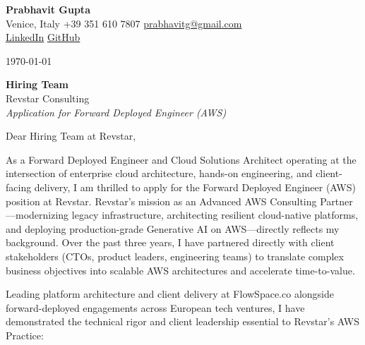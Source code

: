 \documentclass[11pt,a4paper]{article}
\begin{document}
\begin{center}
    {\huge \textbf{Prabhavit Gupta}} \\
    \vspace{3pt}
    Venice, Italy \textbar{} +39 351 610 7807 \textbar{} \href{mailto:prabhavitg@gmail.com}{prabhavitg@gmail.com} \\
    \href{https://www.linkedin.com/in/prabhavit/}{LinkedIn} \textbar{} \href{https://github.com/prab-gupta}{GitHub}
\end{center}

\vspace{10pt}

\noindent \today

\vspace{6pt}

\noindent \textbf{Hiring Team} \\
Revstar Consulting \\
\textit{Application for Forward Deployed Engineer (AWS)}

\vspace{8pt}

\noindent Dear Hiring Team at Revstar,

\vspace{6pt}

\noindent As a Forward Deployed Engineer and Cloud Solutions Architect operating at the intersection of enterprise cloud architecture, hands-on engineering, and client-facing delivery, I am thrilled to apply for the Forward Deployed Engineer (AWS) position at Revstar. Revstar's mission as an Advanced AWS Consulting Partner---modernizing legacy infrastructure, architecting resilient cloud-native platforms, and deploying production-grade Generative AI on AWS---directly reflects my background. Over the past three years, I have partnered directly with client stakeholders (CTOs, product leaders, engineering teams) to translate complex business objectives into scalable AWS architectures and accelerate time-to-value.

\vspace{5pt}

\noindent Leading platform architecture and client delivery at FlowSpace.co alongside forward-deployed engagements across European tech ventures, I have demonstrated the technical rigor and client leadership essential to Revstar's AWS Practice:
\end{document}
